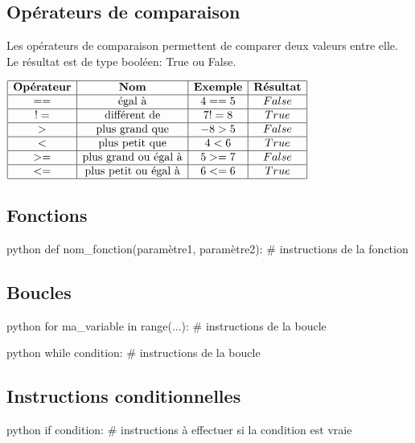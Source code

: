 \documentclass[a4paper,11pt]{article}
\begin{document}
\subsection{Opérateurs de comparaison}
Les opérateurs de comparaison permettent de comparer deux valeurs entre elle. Le résultat est de type booléen: True ou False.\par
\begin{center}
$\begin{array}{|c|c|c|c|}
\hline
\textbf{Opérateur} & \textbf{Nom} & \textbf{Exemple} & \textbf{Résultat} \\
\hline
== & \text{égal à} & 4 == 5 & False\\
\hline
!= & \text{différent de} & 7 != 8 & True\\
\hline
> & \text{plus grand que} &  -8 > 5 & False\\
\hline
< & \text{plus petit que} & 4 < 6 & True\\
\hline
>= & \text{plus grand ou égal à} &  5 >= 7 & False\\
\hline
<= & \text{plus petit ou égal à} & 6 <= 6 & True\\
\hline
\end{array}$
\end{center}

\subsection{Fonctions}
\begin{code}{python}
def nom_fonction(paramètre1, paramètre2):
  # instructions de la fonction
\end{code}

\subsection{Boucles}
\begin{code}{python}
for ma_variable in range(...):
  # instructions de la boucle
\end{code}

\begin{code}{python}
while condition:
  # instructions de la boucle
\end{code}

\subsection{Instructions conditionnelles}
\begin{code}{python}
if condition:
  # instructions à effectuer si la condition est vraie
\end{code}
\end{document}

